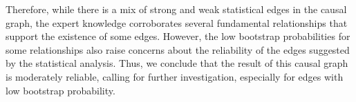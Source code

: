 \documentclass{article}
\begin{document}
Therefore, while there is a mix of strong and weak statistical edges in the causal graph, the expert knowledge corroborates several fundamental relationships that support the existence of some edges. However, the low bootstrap probabilities for some relationships also raise concerns about the reliability of the edges suggested by the statistical analysis. Thus, we conclude that the result of this causal graph is moderately reliable, calling for further investigation, especially for edges with low bootstrap probability.
\end{document}
